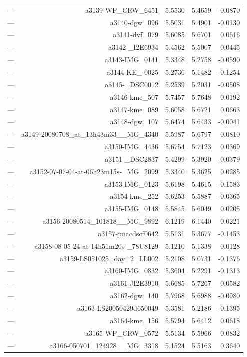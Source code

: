 \begin{table}[htbp]
\begin{tabular}{lrrrr}
— & a3139-WP_CRW_6451 & 5.5530 & 5.4659 & -0.0870 \\
— & a3140-dgw_096 & 5.5031 & 5.4901 & -0.0130 \\
— & a3141-dvf_079 & 5.6085 & 5.6701 & 0.0616 \\
— & a3142-_I2E6934 & 5.4562 & 5.5007 & 0.0445 \\
— & a3143-IMG_0141 & 5.3348 & 5.2758 & -0.0590 \\
— & a3144-KE_-0025 & 5.2736 & 5.1482 & -0.1254 \\
— & a3145-_DSC0012 & 5.2539 & 5.2031 & -0.0508 \\
— & a3146-kme_507 & 5.7457 & 5.7648 & 0.0192 \\
— & a3147-kme_089 & 5.6058 & 5.6721 & 0.0663 \\
— & a3148-dgw_107 & 5.6474 & 5.6433 & -0.0041 \\
— & a3149-20080708_at_13h43m33__MG_4340 & 5.5987 & 5.6797 & 0.0810 \\
— & a3150-IMG_4436 & 5.6754 & 5.7123 & 0.0369 \\
— & a3151-_DSC2837 & 5.4299 & 5.3920 & -0.0379 \\
— & a3152-07-07-04-at-06h23m15s-_MG_2099 & 5.3340 & 5.3625 & 0.0285 \\
— & a3153-IMG_0123 & 5.6198 & 5.4615 & -0.1583 \\
— & a3154-kme_252 & 5.6253 & 5.5887 & -0.0365 \\
— & a3155-IMG_0148 & 5.5845 & 5.6049 & 0.0205 \\
— & a3156-20080514_101818__MG_9892 & 6.1219 & 6.1440 & 0.0221 \\
— & a3157-jmacdscf0642 & 5.5131 & 5.3677 & -0.1453 \\
— & a3158-08-05-24-at-14h51m20s-_78U8129 & 5.1210 & 5.1338 & 0.0128 \\
— & a3159-LS051025_day_2_LL002 & 5.2108 & 5.0731 & -0.1376 \\
— & a3160-IMG_0832 & 5.3604 & 5.2291 & -0.1313 \\
— & a3161-JI2E3910 & 5.6685 & 5.7267 & 0.0582 \\
— & a3162-dgw_140 & 5.7968 & 5.6988 & -0.0980 \\
— & a3163-LS20050429d650049 & 5.3581 & 5.2186 & -0.1395 \\
— & a3164-kme_156 & 5.5794 & 5.6412 & 0.0618 \\
— & a3165-WP_CRW_0572 & 5.5134 & 5.5966 & 0.0832 \\
— & a3166-050701_124928__MG_3318 & 5.1524 & 5.5163 & 0.3640 \\

\end{tabular}
\end{table}
